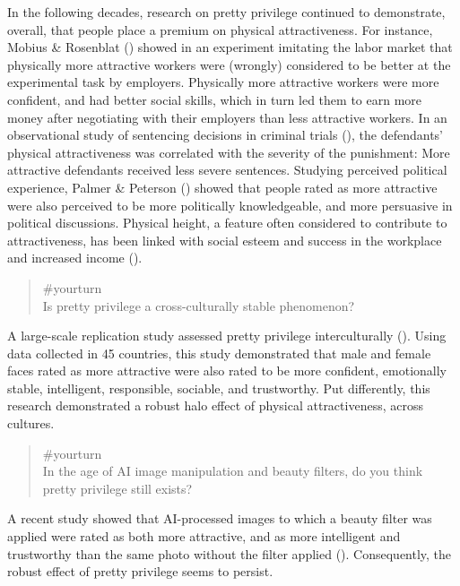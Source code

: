 \documentclass[
  letterpaper,
]{book}
\begin{document}
In the following decades, research on pretty privilege continued to
demonstrate, overall, that people place a premium on physical
attractiveness. For instance, Mobius \& Rosenblat
() showed in an experiment imitating
the labor market that physically more attractive workers were (wrongly)
considered to be better at the experimental task by employers.
Physically more attractive workers were more confident, and had better
social skills, which in turn led them to earn more money after
negotiating with their employers than less attractive workers. In an
observational study of sentencing decisions in criminal trials
(), the
defendants' physical attractiveness was correlated with the severity of
the punishment: More attractive defendants received less severe
sentences. Studying perceived political experience, Palmer \& Peterson
() showed that people rated as more
attractive were also perceived to be more politically knowledgeable, and
more persuasive in political discussions. Physical height, a feature
often considered to contribute to attractiveness, has been linked with
social esteem and success in the workplace and increased income
().

\begin{quote}
{\#yourturn}\\
Is pretty privilege a cross-culturally stable phenomenon?
\end{quote}

A large-scale replication study assessed pretty privilege
interculturally (). Using data collected in 45 countries, this study
demonstrated that male and female faces rated as more attractive were
also rated to be more confident, emotionally stable, intelligent,
responsible, sociable, and trustworthy. Put differently, this research
demonstrated a robust halo effect of physical attractiveness, across
cultures.

\begin{quote}
{\#yourturn}\\
In the age of AI image manipulation and beauty filters, do you think
pretty privilege still exists?
\end{quote}

A recent study showed that AI-processed images to which a beauty filter
was applied were rated as both more attractive, and as more intelligent
and trustworthy than the same photo without the filter applied
(). Consequently,
the robust effect of pretty privilege seems to persist.
\end{document}
